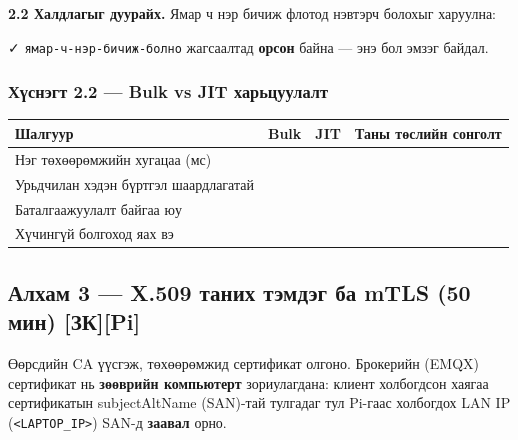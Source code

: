 \textbf{2.2 Халдлагыг дуурайх.} Ямар ч нэр бичиж флотод нэвтэрч болохыг харуулна:

\begin{Shaded}
\begin{Highlighting}[]
\KeywordTok{|} 
\end{Highlighting}
\end{Shaded}

✓ \texttt{ямар-ч-нэр-бичиж-болно} жагсаалтад \textbf{орсон} байна --- энэ бол эмзэг байдал.

\hypertarget{ux445ux4afux441ux43dux44dux433ux442-2.2-bulk-vs-jit-ux445ux430ux440ux44cux446ux443ux443ux43bux430ux43bux442}{%
\subsubsection{Хүснэгт 2.2 --- Bulk vs JIT харьцуулалт}\label{ux445ux4afux441ux43dux44dux433ux442-2.2-bulk-vs-jit-ux445ux430ux440ux44cux446ux443ux443ux43bux430ux43bux442}}

\begingroup\scriptsize\begin{longtable}[]{@{}llll@{}}
\toprule
Шалгуур & Bulk & JIT & Таны төслийн сонголт\tabularnewline
\midrule
\endhead
Нэг төхөөрөмжийн хугацаа (мс) & & &\tabularnewline
Урьдчилан хэдэн бүртгэл шаардлагатай & & &\tabularnewline
Баталгаажуулалт байгаа юу & & &\tabularnewline
Хүчингүй болгоход яах вэ & & &\tabularnewline
\bottomrule
\end{longtable}\endgroup

\hypertarget{ux430ux43bux445ux430ux43c-3-x.509-ux442ux430ux43dux438ux445-ux442ux44dux43cux434ux44dux433-ux431ux430-mtls-50-ux43cux438ux43d-ux437ux43api}{%
\subsection{Алхам 3 --- X.509 таних тэмдэг ба mTLS (50 мин) {[}ЗК{]}{[}Pi{]}}\label{ux430ux43bux445ux430ux43c-3-x.509-ux442ux430ux43dux438ux445-ux442ux44dux43cux434ux44dux433-ux431ux430-mtls-50-ux43cux438ux43d-ux437ux43api}}

Өөрсдийн CA үүсгэж, төхөөрөмжид сертификат олгоно. Брокерийн (EMQX) сертификат нь \textbf{зөөврийн компьютерт} зориулагдана: клиент холбогдсон хаягаа сертификатын subjectAltName (SAN)-тай тулгадаг тул Pi-гаас холбогдох LAN IP (\texttt{\textless{}LAPTOP\_\allowbreak{}IP\textgreater{}}) SAN-д \textbf{заавал} орно.

